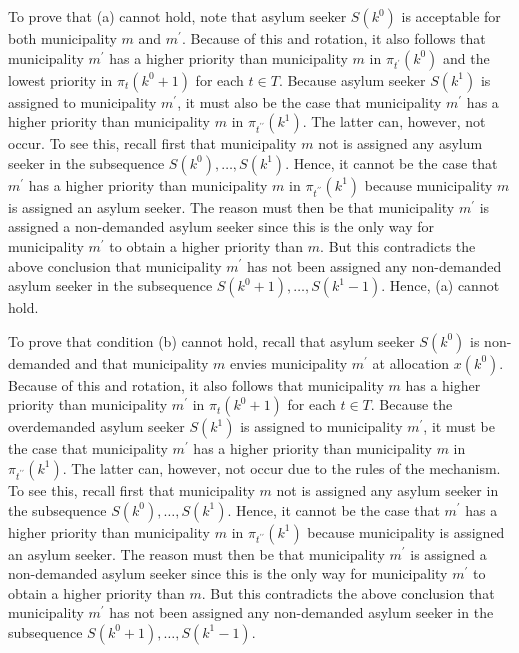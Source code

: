 \documentclass[12pt,fleqn]{article}
\begin{document}
To prove that (a) cannot hold, note that asylum seeker $S(k^0)$ is acceptable for both municipality $m$ and $m^\prime$. Because of this and rotation, it also follows that municipality $m^\prime$ has a higher priority than municipality $m$ in $\pi_{t^\prime}(k^0)$ and the lowest priority in $\pi_t(k^0+1)$ for each $t\in T$. Because asylum seeker $S(k^1)$ is assigned to municipality $m^\prime$, it must also be the case that municipality $m^\prime$ has a higher priority than municipality $m$ in $\pi_{t^{\prime\prime}}(k^1)$. The latter can, however, not occur. To see this, recall first that municipality $m$ not is assigned any asylum seeker in the subsequence $S(k^0),\ldots,S(k^1)$. Hence, it cannot be the case that $m^\prime$ has a higher priority than municipality $m$ in $\pi_{t^{\prime\prime}}(k^1)$ because municipality $m$ is assigned an asylum seeker. The reason must then be that municipality $m^\prime$ is assigned a non-demanded asylum seeker since this is the only way for municipality $m^\prime$ to obtain a higher priority than $m$. But this contradicts the above conclusion that municipality $m^\prime$ has not been assigned any non-demanded asylum seeker in the subsequence $S(k^0+1),\ldots,S(k^1-1)$. Hence, (a) cannot hold.

To prove that condition (b) cannot hold, recall that asylum seeker $S(k^0)$ is non-demanded and that municipality $m$ envies municipality $m^\prime$ at allocation $x(k^0)$. Because of this and rotation, it also follows that municipality $m$ has a higher priority than municipality $m^\prime$ in $\pi_t(k^0+1)$ for each $t\in T$. Because the overdemanded asylum seeker $S(k^1)$ is assigned to municipality $m^\prime$, it must be the case that municipality $m^\prime$ has a higher priority than municipality $m$ in $\pi_{t^{\prime\prime}}(k^1)$. The latter can, however, not occur due to the rules of the mechanism. To see this, recall first that municipality $m$ not is assigned any asylum seeker in the subsequence $S(k^0),\ldots,S(k^1)$. Hence, it cannot be the case that $m^\prime$ has a higher priority than municipality $m$ in $\pi_{t^{\prime\prime}}(k^1)$ because municipality is assigned an asylum seeker. The reason must then be that municipality $m^\prime$ is assigned a non-demanded asylum seeker since this is the only way for municipality $m^\prime$ to obtain a higher priority than $m$. But this contradicts the above conclusion that municipality $m^\prime$ has not been assigned any non-demanded asylum seeker in the subsequence $S(k^0+1),\ldots,S(k^1-1)$.
\end{document}
